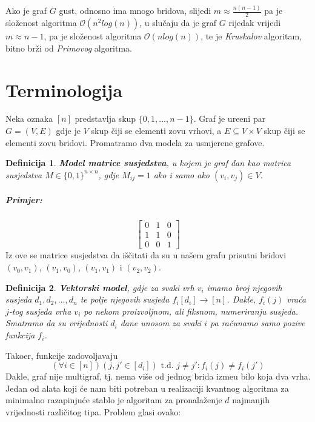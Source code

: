 \documentclass[a4paper,12pt]{article}
\newtheorem{df}{Definicija}
\begin{document}
Ako je graf $G$ gust, odnosno ima mnogo bridova, slijedi $m \approx  \frac{n(n-1)}{2} $ pa je slo\v{z}enost algoritma $\mathcal{O} (n^2log(n))$, u slu\v{c}aju da je graf $G$ rijedak vrijedi $m  \approx n-1$, pa je slo\v{z}enost algoritma $ \mathcal{O}(nlog(n))$, te je \emph{Kruskalov} algoritam, bitno br\v{z}i od \emph{Primovog} algoritma.


\newpage
\section{Terminologija}

 Neka oznaka $[n]$ predstavlja skup $\{0,1,...,n-1\}$. Graf je ure\dj{}eni par $G=(V,E)$ gdje je $V$ skup \v{c}iji se elementi zovu vrhovi, a $E\subseteq V\times V$ skup \v{c}iji se elementi zovu bridovi. Promatramo dva modela za usmjerene grafove.

\begin{df}
\textbf{Model matrice susjedstva}, u kojem je graf dan kao matrica susjedstva $M\in\{0,1\}^{n\times n}$, gdje $M_{ij}=1$ 
	ako i samo ako $(v_i,v_j)\in V$.

\end{df}

\subparagraph{Primjer:}
		\begin{equation*}
		\left[
		\begin{matrix}
			0 & 1 & 0 \\
			1 & 1 & 0 \\
			0 & 0 & 1
		\end{matrix}
		\right]
		\end{equation*}
		Iz ove se matrice susjedstva da i\v{s}\v{c}itati da su u na\v{s}em grafu prisutni bridovi
		$(v_0,v_1)$, $(v_1,v_0)$, $(v_1,v_1)$ i $(v_2,v_2)$.

\begin{df}
	\textbf{Vektorski model}, gdje za svaki vrh $v_i$ imamo broj njegovih susjeda $d_1,d_2,...,d_n$ te polje njegovih	susjeda $f_i[d_i]\rightarrow[n]$. Dakle, $f_i(j)$ vra\'ca $j$-tog susjeda vrha $v_i$ po nekom proizvoljnom, ali fiksnom, numeriranju susjeda. Smatramo da su vrijednosti $d_i$ dane unosom za svaki $i$ pa ra\v{c}unamo samo pozive funkcija $f_i$.
\end{df}

Tako\dj{}er, funkcije zadovoljavaju
	\begin{equation*}
		(\forall i\in[n])(j,j'\in[d_i])\text{ t.d. } j\neq j':f_i(j)\neq f_i(j')
	\end{equation*}
	Dakle, graf nije multigraf, tj. nema vi\v{s}e od jednog brida izme\dj{}u bilo koja dva vrha.
	\\
		Jedan od alata koji \'ce nam biti potreban u realizaciji kvantnog algoritma za minimalno razapinju\'ce
		stablo je algoritam za pronala\v{z}enje $d$ najmanjih vrijednosti razli\v{c}itog tipa. Problem glasi ovako:
\end{document}
